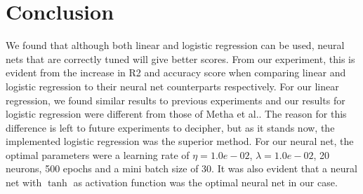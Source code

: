 














% 
\section{Conclusion}
We found that although both linear and logistic regression can be used, neural nets that are correctly tuned will give better scores. From our experiment, this is evident from the increase in R2 and accuracy score when comparing linear and logistic regression to their neural net counterparts respectively. For our linear regression, we found similar results to previous experiments and our results for logistic regression were different from those of Metha et al.. The reason for this difference is left to future experiments to decipher, but as it stands now, the implemented logistic regression was the superior method. For our neural net, the optimal parameters were a learning rate of $\eta = 1.0e-02$, $\lambda = 1.0e-02$, 20 neurons, 500 epochs and a mini batch size of 30. It was also evident that a neural net with $\tanh$ as activation function was the optimal neural net in our case.
% 